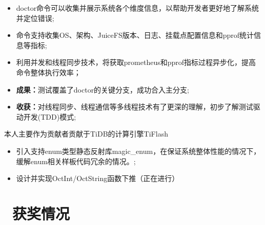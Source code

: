 \documentclass{resume}
\begin{document}
\begin{onehalfspacing}
  \begin{itemize}
    \item doctor命令可以收集并展示系统各个维度信息，以帮助开发者更好地了解系统并定位错误;
    \item 命令支持收集OS、架构、JuiceFS版本、日志、挂载点配置信息和pprof统计信息等指标;
    \item 利用并发和线程同步技术，将获取prometheus和pprof指标过程异步化，提高命令整体执行效率；
    \item \textbf{成果：}测试覆盖了doctor的关键分支，成功合入主分支;
    \item \textbf{收获：}对线程同步、线程通信等多线程技术有了更深的理解，初步了解测试驱动开发(TDD)模式;
  \end{itemize}
\end{onehalfspacing}

本人主要作为贡献者贡献于TiDB的计算引擎TiFlash
\begin{itemize}
  \item 引入支持enum类型静态反射库magic\_enum，在保证系统整体性能的情况下，缓解enum相关样板代码冗余的情况。;
  \item 设计并实现OctInt/OctString函数下推（正在进行）
\end{itemize}

\section{\faHeartO\ 获奖情况}
\end{document}
